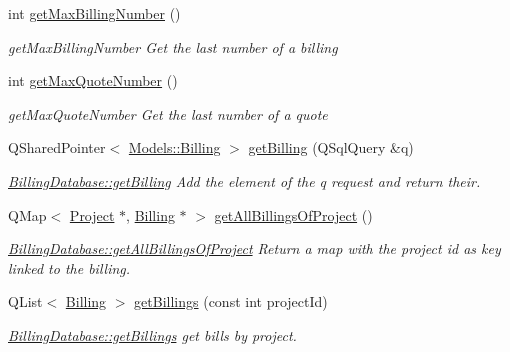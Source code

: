 \begin{DoxyCompactItemize}
int \hyperlink{classDatabases_1_1BillingDatabase_a57e4b68cac145ba400d408698312599b}{get\-Max\-Billing\-Number} ()
\begin{DoxyCompactList}\small\item\em get\-Max\-Billing\-Number Get the last number of a billing \end{DoxyCompactList}\item 
int \hyperlink{classDatabases_1_1BillingDatabase_a91704d31741279aacf9a9903b7ebcbf5}{get\-Max\-Quote\-Number} ()
\begin{DoxyCompactList}\small\item\em get\-Max\-Quote\-Number Get the last number of a quote \end{DoxyCompactList}\item 
Q\-Shared\-Pointer$<$ \hyperlink{classModels_1_1Billing}{Models\-::\-Billing} $>$ \hyperlink{classDatabases_1_1BillingDatabase_a2e6c6cd8b3b040eeb7fc6ae727e85013}{get\-Billing} (Q\-Sql\-Query \&q)
\begin{DoxyCompactList}\small\item\em \hyperlink{classDatabases_1_1BillingDatabase_a835d4ca35a046fe1d0b336a1b8cf8f85}{Billing\-Database\-::get\-Billing} Add the element of the {\itshape q} request and return their. \end{DoxyCompactList}\item 
Q\-Map$<$ \hyperlink{classModels_1_1Project}{Project} $\ast$, \hyperlink{classModels_1_1Billing}{Billing} $\ast$ $>$ \hyperlink{classDatabases_1_1BillingDatabase_a44c3e09fbb7d540579f4cceae4d6901f}{get\-All\-Billings\-Of\-Project} ()
\begin{DoxyCompactList}\small\item\em \hyperlink{classDatabases_1_1BillingDatabase_a44c3e09fbb7d540579f4cceae4d6901f}{Billing\-Database\-::get\-All\-Billings\-Of\-Project} Return a map with the project id as key linked to the billing. \end{DoxyCompactList}\item 
Q\-List$<$ \hyperlink{classModels_1_1Billing}{Billing} $>$ \hyperlink{classDatabases_1_1BillingDatabase_a0eb72e4dfee0ff38f2f4b795a16007c8}{get\-Billings} (const int project\-Id)
\begin{DoxyCompactList}\small\item\em \hyperlink{classDatabases_1_1BillingDatabase_a0eb72e4dfee0ff38f2f4b795a16007c8}{Billing\-Database\-::get\-Billings} get bills by project. \end{DoxyCompactList}\end{DoxyCompactItemize}
